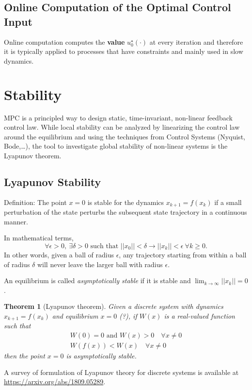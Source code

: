 \documentclass[11pt]{report}
\newtheorem{theorem}{Theorem}
\begin{document}
\subsection{Online Computation of the Optimal Control Input}
\label{sec:online-computation-MPC}

Online computation computes the \textbf{value} $u_0^\star(\cdot)$ at every iteration and therefore it is typically applied to processes that have constraints and mainly used in slow dynamics.

\section{Stability}
\label{sec:mpc-stability}

MPC is a principled way to design static, time-invariant, non-linear feedback control law. While local stability can be analyzed by linearizing the control law around the equilibrium and using the techniques from Control Systems (Nyquist, Bode,\ldots), the tool to investigate global stability of non-linear systems is the Lyapunov theorem.

\subsection{Lyapunov Stability}
\label{sec:lyapunov-stability}

Definition: The point $x=0$ is stable for the dynamics $x_{k+1} = f(x_k)$ if a small perturbation of the state perturbs the subsequent state trajectory in a continuous manner.

In mathematical terms,
\begin{equation}
  \label{eq:lyapunov-stability-stable-equilibrium}
  \forall \epsilon > 0,\ \exists \delta > 0 \text{ such that } ||x_0|| < \delta \rightarrow ||x_k|| < \epsilon\ \forall k \ge 0.
\end{equation}
In other words, given a ball of radius $\epsilon$, any trajectory starting from within a ball of radius $\delta$ will never leave the larger ball with radius $\epsilon$.

An equilibrium is called \emph{asymptotically stable} if it is stable and $\lim_{k\rightarrow \infty} ||x_k||=0$.

\begin{theorem}[Lyapunov theorem]
  \label{th:lyapunov}
  Given a discrete system with dynamics $x_{k+1} = f(x_k)$ and equilibrium $x=0$ (?), if $W(x)$ is a real-valued function such that
  \begin{align*}
    W(0)=0 \text{ and } W(x)>0\quad \forall x\neq 0 \\
    W(f(x)) < W(x)\quad \forall x\neq 0
  \end{align*}
  then the point $x=0$ is asymptotically stable.
\end{theorem}
A survey of formulation of Lyapunov theory for discrete systems is available at \url{https://arxiv.org/abs/1809.05289}.
\end{document}
